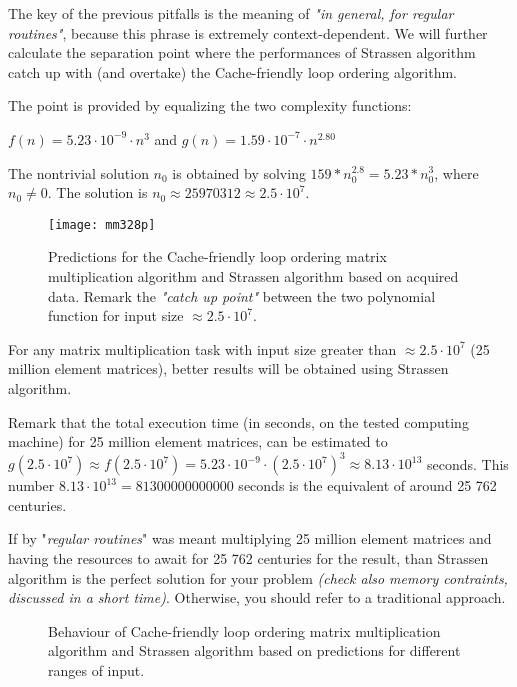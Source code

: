 The key of the previous pitfalls is the meaning of \textit{"in general, for regular routines"}, because this phrase is extremely context-dependent. We will further calculate the separation point where the performances of Strassen algorithm catch up with (and overtake) the Cache-friendly loop ordering algorithm.

The point is provided by equalizing the two complexity functions:

$f(n) = 5.23 \cdot 10^{-9} \cdot n^{3} $ and $g(n) = 1.59 \cdot 10^{-7} \cdot n^{2.80} $

The nontrivial solution $n_{0}$ is obtained by solving $ 159 * n_{0}^{2.8} = 5.23* n_{0}^3 $, where $n_{0} \neq 0$. The solution is $n_{0} \approx 25970312 \approx 2.5 \cdot 10^7$.

\begin{figure}[H]
\centering
\texttt{[image: mm328p]}
\caption{Predictions for the Cache-friendly loop ordering matrix multiplication algorithm and Strassen algorithm based on acquired data. Remark the \textit{"catch up point"} between the two polynomial function for input size $\approx 2.5 \cdot 10^7$. }
\end{figure}

For any matrix multiplication task with input size greater than $\approx 2.5 \cdot 10^7$ (25 million element matrices), better results will be obtained using Strassen algorithm.

Remark that the total execution time (in seconds, on the tested computing machine) for 25 million element matrices, can be estimated to $g(2.5 \cdot 10^7) \approx f(2.5 \cdot 10^7) = 5.23 \cdot 10^{-9} \cdot (2.5 \cdot 10^7)^{3} \approx 8.13 \cdot 10^{13}$ seconds. This number $8.13 \cdot 10^{13} = 81300000000000 $ seconds is the equivalent of around 25 762 centuries. 

If by "\textit{regular routines}" was meant multiplying 25 million element matrices and having the resources to await for 25 762 centuries for the result, than Strassen algorithm is the perfect solution for your problem \textit{(check also memory contraints, discussed in a short time)}. Otherwise, you should refer to a traditional approach.

\begin{figure}[H]
\caption{Behaviour of Cache-friendly loop ordering matrix multiplication algorithm and Strassen algorithm based on predictions for different ranges of input.}
\end{figure}



